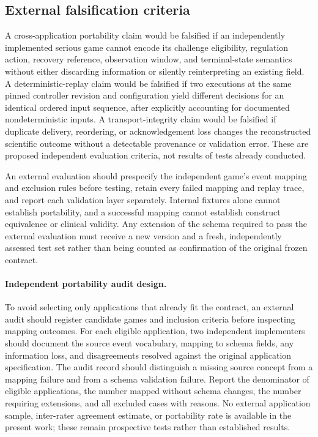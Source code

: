 \subsection{External falsification criteria}

A cross-application portability claim would be falsified if an independently implemented serious game cannot encode its challenge eligibility, regulation action, recovery reference, observation window, and terminal-state semantics without either discarding information or silently reinterpreting an existing field. A deterministic-replay claim would be falsified if two executions at the same pinned controller revision and configuration yield different decisions for an identical ordered input sequence, after explicitly accounting for documented nondeterministic inputs. A transport-integrity claim would be falsified if duplicate delivery, reordering, or acknowledgement loss changes the reconstructed scientific outcome without a detectable provenance or validation error. These are proposed independent evaluation criteria, not results of tests already conducted.

An external evaluation should prespecify the independent game's event mapping and exclusion rules before testing, retain every failed mapping and replay trace, and report each validation layer separately. Internal fixtures alone cannot establish portability, and a successful mapping cannot establish construct equivalence or clinical validity. Any extension of the schema required to pass the external evaluation must receive a new version and a fresh, independently assessed test set rather than being counted as confirmation of the original frozen contract.

\paragraph{Independent portability audit design.}
To avoid selecting only applications that already fit the contract, an external audit should register candidate games and inclusion criteria before inspecting mapping outcomes. For each eligible application, two independent implementers should document the source event vocabulary, mapping to schema fields, any information loss, and disagreements resolved against the original application specification. The audit record should distinguish a missing source concept from a mapping failure and from a schema validation failure. Report the denominator of eligible applications, the number mapped without schema changes, the number requiring extensions, and all excluded cases with reasons. No external application sample, inter-rater agreement estimate, or portability rate is available in the present work; these remain prospective tests rather than established results.

